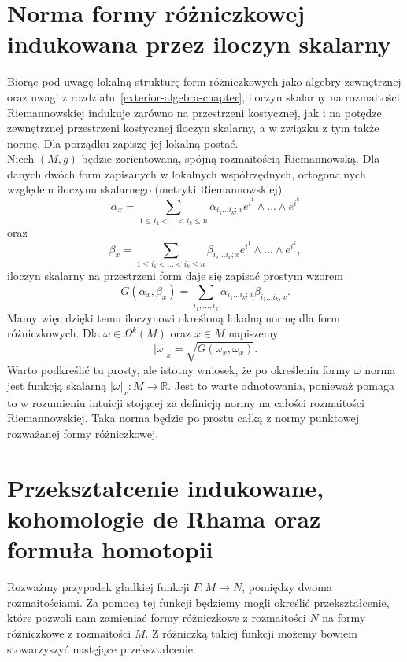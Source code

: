 \documentclass[licencjacka]{pracamgr}
\theoremstyle{definition}
\theoremstyle{definition}
\theoremstyle{plain}
\theoremstyle{plain}
\theoremstyle{plain}
\theoremstyle{plain}
\begin{document}
\section{Norma formy różniczkowej indukowana przez iloczyn skalarny}
Biorąc pod uwagę lokalną strukturę form różniczkowych jako algebry
zewnętrznej oraz uwagi z rozdziału~\ref{exterior-algebra-chapter},
iloczyn skalarny na rozmaitości Riemannowskiej indukuje zarówno na
przestrzeni kostycznej, jak i na potędze zewnętrznej przestrzeni
kostycznej iloczyn skalarny, a w związku z tym także normę. Dla
porządku zapiszę jej lokalną postać. \\

Niech $(M, g)$ będzie zorientowaną, spójną 
rozmaitością Riemannowską.
Dla danych dwóch form zapisanych w lokalnych współrzędnych, ortogonalnych
względem iloczynu skalarnego (metryki Riemannowskiej)
\[
\alpha_x = \sum_{1 \leq i_1 < ... < i_k \leq n} \alpha_{i_1 ... i_k; x} e^{i^1}
\wedge ...  \wedge e^{i^k}
\]
 oraz
\[ \beta_x = \sum_{1 \leq i_1 < ... < i_k \leq n} \beta_{i_1 ... i_k; x} e^{i^1}
\wedge ...  \wedge e^{i^k},
\]
iloczyn skalarny na przestrzeni form daje się zapisać prostym wzorem
\[
    G(\alpha_x, \beta_x) = \sum_{i_1, ..., i_k} \alpha_{i_1 ... i_k; x}
                                                    \beta_{i_1 ... i_k; x}.
\] 
Mamy więc dzięki temu iloczynowi określoną lokalną normę dla form różniczkowych.
Dla $\omega \in \Omega^k(M)$ oraz $x \in M$ napiszemy
\[
    |\omega|_x = \sqrt{ G(\omega_x, \omega_x) }.
\]
Warto podkreślić tu prosty, ale istotny wniosek, że po określeniu formy $\omega$
norma jest funkcją skalarną $| \omega |_x : M \rightarrow \mathbb{R} $. Jest to warte
odnotowania, ponieważ pomaga to w rozumieniu intuicji stojącej za definicją normy
na całości rozmaitości Riemannowskiej. Taka norma będzie po prostu całką 
z normy punktowej rozważanej formy różniczkowej. \\


\section{Przekształcenie indukowane, kohomologie de Rhama oraz formuła homotopii}
Rozważmy przypadek gładkiej funkcji $F: M \rightarrow N$, pomiędzy
dwoma rozmaitościami. Za pomocą tej
funkcji będziemy mogli określić przekształcenie, które pozwoli nam
zamieniać formy różniczkowe z rozmaitości $N$ na formy różniczkowe z
rozmaitości $M$. Z różniczką takiej funkcji możemy bowiem stowarzyszyć nastęjące
przekształcenie.
\end{document}
